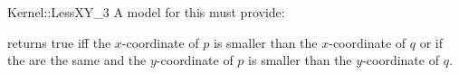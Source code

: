 \begin{ccRefFunctionObjectConcept}{Kernel::LessXY_3}
A model for this must provide:


{returns true iff the $x$-coordinate of $p$ is smaller than the
$x$-coordinate of $q$ or if the are the same and 
the $y$-coordinate of $p$ is smaller than the $y$-coordinate of $q$.}

\ccSeeAlso
{}\\

\end{ccRefFunctionObjectConcept}
